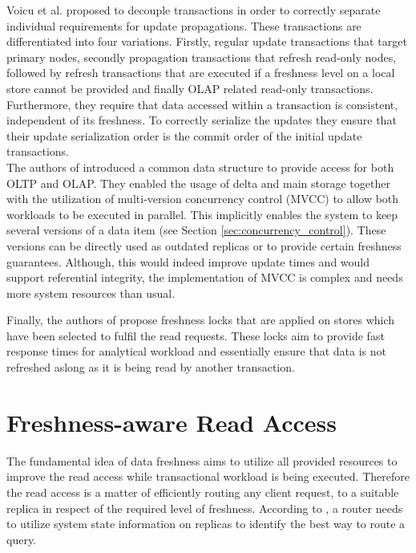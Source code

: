 Voicu et al. \cite{voicu:2010} proposed to decouple transactions in order to correctly separate individual requirements for update propagations.
These transactions are differentiated into four variations. Firstly, regular update transactions that target primary nodes, secondly propagation transactions 
that refresh read-only nodes, followed by refresh transactions that are executed if a freshness level on a local store cannot be provided and 
finally OLAP related read-only transactions.
Furthermore, they require that data accessed within a transaction is consistent, independent of its freshness. To correctly serialize the updates
they ensure that their update serialization order is the commit order of the initial update transactions.\\
The authors of \cite{psaroudakis:2015} introduced a common data structure to provide access for both OLTP and OLAP. 
They enabled the usage of delta and main storage together with the utilization of multi-version concurrency control (MVCC) to allow both workloads to be executed in parallel.
This implicitly enables the system to keep several versions of a data item (see Section \ref{sec:concurrency_control}).
These versions can be directly used as outdated replicas or to provide certain freshness guarantees.
Although, this would indeed improve update times and would support referential integrity, the implementation of MVCC is complex and needs more system resources than usual.

Finally, the authors of \cite{akal:2005} propose freshness locks that are applied on stores which have been selected to fulfil the read requests. 
These locks aim to provide fast response times for analytical workload and essentially ensure that data is not refreshed aslong as it is being read by another transaction.



\section{Freshness-aware Read Access}
\label{r:read}
The fundamental idea of data freshness aims to utilize all provided resources to improve the read access while transactional workload is being executed.
Therefore the read access is a matter of efficiently routing any client request, to a suitable replica in respect of the required level of freshness.
According to \cite{rohm:2002, akal:2005}, a router needs to utilize system state information on replicas to identify the best way to route a query.

